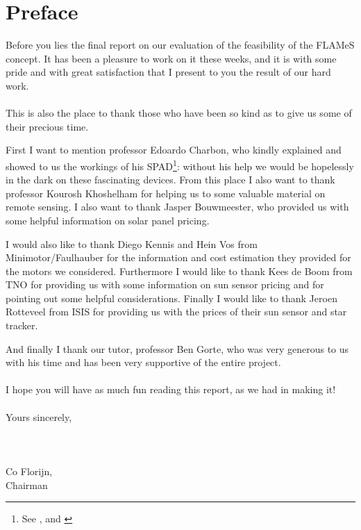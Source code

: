 \chapter*{Preface}
Before you lies the final report on our evaluation of the feasibility of the \acf{FLAMeS} concept. It has been a pleasure to work on it these weeks, and it is with some pride and with great satisfaction that I present to you the result of our hard work.\\\\
This is also the place to thank those who have been so kind as to give us some of their precious time.

First I want to mention professor Edoardo Charbon, who kindly explained and showed to us the workings of his \ac{SPAD}\footnote{See \cite[98-105]{SPADThesis}, \cite{SPAD2} and \cite{SPAD3}}: without his help we would be hopelessly in the dark on these fascinating devices. From this place I also want to thank professor Kourosh Khoshelham for helping us to some valuable material on remote sensing. I also want to thank Jasper Bouwmeester, who provided us with some helpful information on solar panel pricing.

I would also like to thank Diego Kennis and Hein Vos from Minimotor/Faulhauber for the information and cost estimation they provided for the motors we considered. Furthermore I would like to thank Kees de Boom from TNO for providing us with some information on sun sensor pricing and for pointing out some helpful considerations. Finally I would like to thank Jeroen Rotteveel from ISIS for providing us with the prices of their sun sensor and star tracker.

And finally I thank our tutor, professor Ben Gorte, who was very generous to us with his time and has been very supportive of the entire project.\\\\
I hope you will have as much fun reading this report, as we had in making it!\\\\
Yours sincerely,\\\\\\\\
 \hspace{2cm}Co Florijn,\\
 \hspace{2cm}Chairman